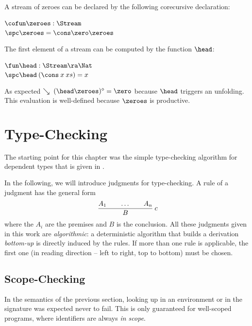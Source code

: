 A stream of zeroes can be declared by the following corecursive declaration:
\begin{bsp}
$\cofun \zeroes: \Stream $ \\
$\spc \zeroes = \cons \zero \zeroes$
\end{bsp}

\noindent The first element of a stream can be computed by the function $\head$:
\begin{bsp}
$\fun \head : \Stream \ra \Nat$\\
$\spc \head \: (\cons \: x \: xs) = x$
\end{bsp}

As expected $\wh\; {\clp{\head \zeroes}{\diamond}} = \zero $ because $\head$ triggers an unfolding. This evaluation is well-defined because $\zeroes$ is productive.

\chapter{Type-Checking}

\renewcommand\Check[5]{#1;#2;#3\vdash#4\leftleftarrows#5}
\newcommand\IsType[4]{#1;#2;#3\vdash#4\:\mathbf{Type}}
\newcommand\DataType[5]{#1;#2;#3;#4\vdash#5\:\mathbf{DataType}}
\newcommand\ConType[5]{#1;#2;#3;#4\vdash#5\:\mathbf{ConType}}
\newcommand\Infer[5]{#1;#2;#3\vdash#4\rightrightarrows#5}
\newcommand\EqVal[4]{#1;#2\vdash#3\Leftrightarrow#4}
\newcommand\FeqVal[4]{#1;#2\vdash#3{\:\leftrightarrow\:}#4}
\newcommand\DeqVal[2]{\vdash#1\leftrightarrow#2}
\newcommand\LeqVal[4]{#1;#2\vdash#3\:\leqq\:#4}
\newcommand\FleqVal[4]{#1;#2\vdash#3{\:\ll\:}#4}
\newcommand\DLeqVal[2]{\vdash#1\leq#2}
\newcommand\SzLeq[2]{\vdash#1\sqsubseteq#2}

The starting point for this chapter was the simple type-checking algorithm for dependent types that is given in \cite{coquand96algorithm}.

In the following, we will introduce judgments for type-checking.
A rule of a judgment has the general form
\[
\ \dfrac{A_1 \qquad \ldots \qquad A_n}{B}
{\: c}
\]
\noindent where the $A_i$ are the premises and $B$ is the conclusion.
All these judgments given in this work are \emph{algorithmic}: a deterministic algorithm that builds a derivation \emph{bottom-up} is directly induced by the rules. If more than one rule is applicable, the first one (in reading direction -- left to right, top to bottom) must be chosen.

\section{Scope-Checking}
In the semantics of the previous section, looking up in an environment or in the signature was expected never to fail. This is only guaranteed for well-scoped programs, where identifiers are always \emph{in scope}.

